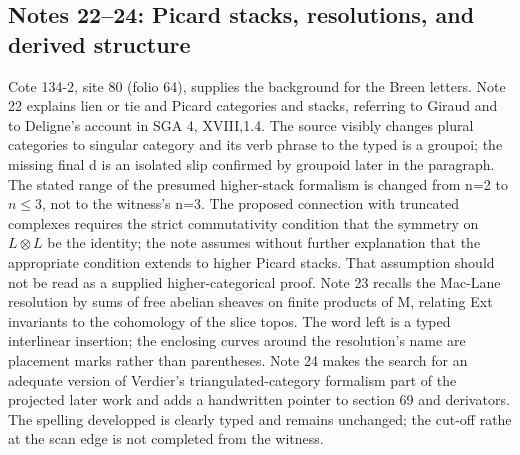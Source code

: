 \documentclass[10pt,oneside]{book}
\begin{document}
\subsection*{Notes 22--24: Picard stacks, resolutions, and derived structure}
Cote 134-2, site 80 (folio 64), supplies the background for the Breen letters. Note 22 explains lien or tie and Picard categories and stacks, referring to Giraud and to Deligne's account in SGA 4, XVIII,1.4. The source visibly changes plural categories to singular category and its verb phrase to the typed is a groupoi; the missing final d is an isolated slip confirmed by groupoid later in the paragraph. The stated range of the presumed higher-stack formalism is changed from n=2 to $n\leq3$, not to the witness's n=3. The proposed connection with truncated complexes requires the strict commutativity condition that the symmetry on $L\otimes L$ be the identity; the note assumes without further explanation that the appropriate condition extends to higher Picard stacks. That assumption should not be read as a supplied higher-categorical proof. Note 23 recalls the Mac-Lane resolution by sums of free abelian sheaves on finite products of M, relating Ext invariants to the cohomology of the slice topos. The word left is a typed interlinear insertion; the enclosing curves around the resolution's name are placement marks rather than parentheses. Note 24 makes the search for an adequate version of Verdier's triangulated-category formalism part of the projected later work and adds a handwritten pointer to section 69 and derivators. The spelling developped is clearly typed and remains unchanged; the cut-off rathe at the scan edge is not completed from the witness.
\end{document}
